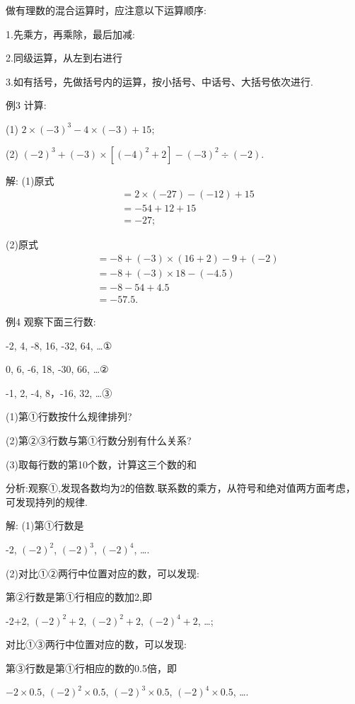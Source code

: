 \documentclass{article}
\begin{document}
做有理数的混合运算时，应注意以下运算顺序:

1.先乘方，再乘除，最后加减:

2.同级运算，从左到右进行

3.如有括号，先做括号内的运算，按小括号、中话号、大括号依次进行.

\begin{example}

例3 计算:

(1) $2\times(-3)^3-4\times(-3)+15$;

(2) $(-2)^3+(-3)\times[(-4)^2+2]-(-3)^2\div(-2)$.

解: (1)原式\begin{align}
        &=2\times(-27)-(-12)+15 \\
        &=-54+12+15     \\
        &=-27;
\end{align}

(2)原式\begin{align}
    &=-8+(-3)\times(16+2)-9+(-2) \\
    &=-8+(-3)\times18-(-4.5) \\
    &=-8-54+4.5 \\
    &=-57.5.
    \end{align}

例4 观察下面三行数:

-2, 4, -8, 16, -32, 64, \dots ①

0, 6, -6, 18, -30, 66, \dots  ②

-1, 2, -4, 8，-16, 32, \dots  ③

(1)第①行数按什么规律排列?

(2)第②③行数与第①行数分别有什么关系?

(3)取每行数的第10个数，计算这三个数的和

分析:观察①,发现各数均为2的倍数.联系数的乘方，从符号和绝对值两方面考虑，可发现持列的规律.

解: (1)第①行数是

-2, $(-2)^2$, $(-2)^3$, $(-2)^4$, \dots.

(2)对比①②两行中位置对应的数，可以发现:

第②行数是第①行相应的数加2,即

-2+2, $(-2)^2+2$,  $(-2)^2+2$, $(-2)^4+2$, \dots;

对比①③两行中位置对应的数，可以发现:

第③行数是第①行相应的数的0.5倍，即

$-2\times0.5$, $(-2)^2\times0.5$, $(-2)^3\times0.5$, $(-2)^4\times0.5$, \dots.


\end{example}
\end{document}
